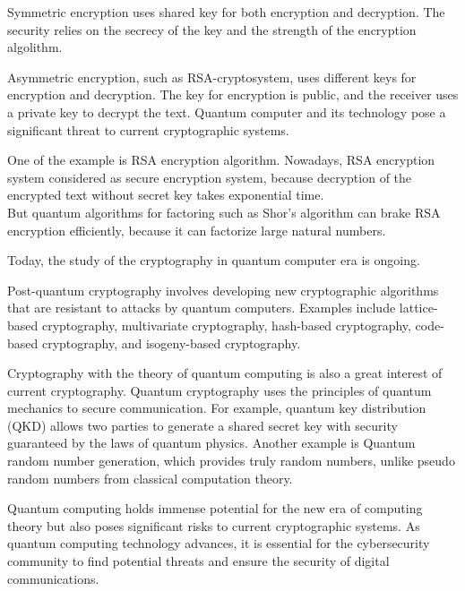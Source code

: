 \documentclass[10pt,twocolumn]{article}          %
\begin{document}
    Symmetric encryption uses shared key for both encryption and decryption. The security relies on the secrecy of the key and the strength of the encryption algolithm.

    Asymmetric encryption, such as RSA-cryptosystem, uses different keys for encryption and decryption. The key for encryption is public, and the receiver uses a private key to decrypt the text.
    Quantum computer and its technology pose a significant threat to current cryptographic systems.

    One of the example is RSA encryption algorithm. Nowadays, RSA encryption system considered as secure encryption system, because decryption of the encrypted text without secret key takes exponential time.
    \\But quantum algorithms for factoring such as Shor's algorithm can brake RSA encryption efficiently, because it can factorize large natural numbers.

    Today, the study of the cryptography in quantum computer era is ongoing.

    Post-quantum cryptography involves developing new cryptographic algorithms that are resistant to attacks by quantum computers.  Examples include lattice-based cryptography, multivariate cryptography, hash-based cryptography, code-based cryptography, and isogeny-based cryptography.

    Cryptography with the theory of quantum computing is also a great interest of current cryptography.
    Quantum cryptography uses the principles of quantum mechanics to secure communication. For example, quantum key distribution (QKD) allows two parties to generate a shared secret key with security guaranteed by the laws of quantum physics. Another example is Quantum random number generation, which provides truly random numbers, unlike pseudo random numbers from classical computation theory.


    Quantum computing holds immense potential for the new era of computing theory but also poses significant risks to current cryptographic systems.
    As quantum computing technology advances, it is essential for the cybersecurity community to find potential threats and ensure the security of digital communications.


    \nocite{a1,b1}
    
    
\end{document}
